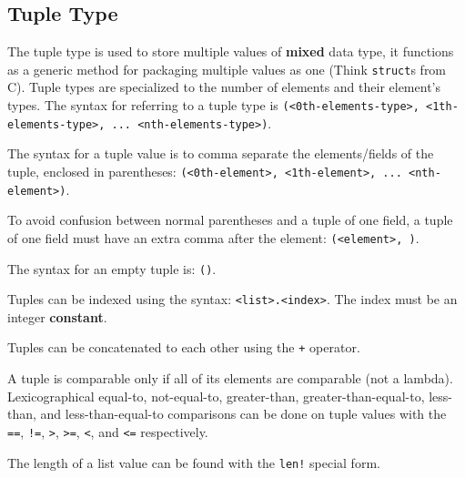
\subsection{Tuple Type}
{
	The tuple type is used to store
	multiple values of \textbf{mixed} data type,
	it functions as a generic method for packaging multiple values
	as one (Think \texttt{struct}s from C).
	Tuple types are specialized to the number of elements and their element's
	types. The syntax for referring to a tuple type
	is \texttt{(<0th-elements-type>, <1th-elements-type>, ... <nth-elements-type>)}.
	
	The syntax for a tuple value is to comma separate the elements/fields
	of the tuple, enclosed in
	parentheses: \texttt{(<0th-element>, <1th-element>, ... <nth-element>)}.
	
	To avoid confusion between normal parentheses
	and a tuple of one field, a tuple of one field must have an extra comma after
	the element: \texttt{(<element>, )}.
	
	The syntax for an empty tuple is: \texttt{()}.
	
	Tuples can be indexed using the
	syntax: \texttt{<list>.<index>}. The
	index must be an integer \textbf{constant}.
	
	Tuples can be concatenated to each other using the \texttt{+} operator.
	
	A tuple is comparable only if all of its elements are comparable (not a lambda).
	Lexicographical equal-to, not-equal-to, greater-than, greater-than-equal-to,
	less-than, and less-than-equal-to comparisons
	can be done on tuple values with
	the \texttt{==}, \texttt{!=},
	\texttt{>}, \texttt{>=}, \texttt{<}, and \texttt{<=} respectively.
	
	The length of a list value can be found with the \texttt{len!} special form.
}
